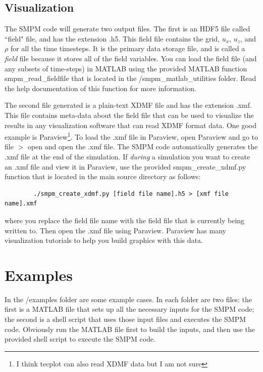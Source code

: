 \documentclass[onside]{article}
\begin{document}
	\subsection{Visualization}

   The SMPM code will generate two output files.  The first is an HDF5 file called ``field" file, and has the extension .h5.  This field file contains the grid, $u_x$, $u_z$, and $\rho$ for all the time timesteps.  It is the primary data storage file, and is called a \emph{field} file because it stores all of the field variables.  You can load the field file (and any subsets of time-steps) in MATLAB using the provided MATLAB function smpm\_read\_fieldfile that is located in the /smpm\_matlab\_utilities folder.  Read the help documentation of this function for more information.

   The second file generated is a plain-text XDMF file and has the extension .xmf.  This file contains meta-data about the field file that can be used to visualize the results in any visualization software that can read XDMF format data.  One good example is Paraview\footnote{I think tecplot can also read XDMF data but I am not sure}.  To load the .xmf file in Paraview, open Paraview and go to file $>$ open and open the .xmf file.  The SMPM code automatically generates the .xmf file at the end of the simulation.  If \emph{during} a simulation you want to create an .xmf file and view it in Paraview, use the provided smpm\_create\_xdmf.py function that is located in the main source directory as follows:
	\begin{verbatim}
		./smpm_create_xdmf.py [field file name].h5 > [xmf file name].xmf
	\end{verbatim}
   where you replace the field file name with the field file that is currently being written to.  Then open the .xmf file using Paraview.  Paraview has many visualization tutorials to help you build graphics with this data.


\section{Examples}

In the /examples folder are some example cases.  In each folder are two files: the first is a MATLAB file that sets up all the necessary inputs for the SMPM code; the second is a shell script that uses those input files and executes the SMPM code.  Obviously run the MATLAB file first to build the inputs, and then use the provided shell script to execute the SMPM code.
\end{document}
